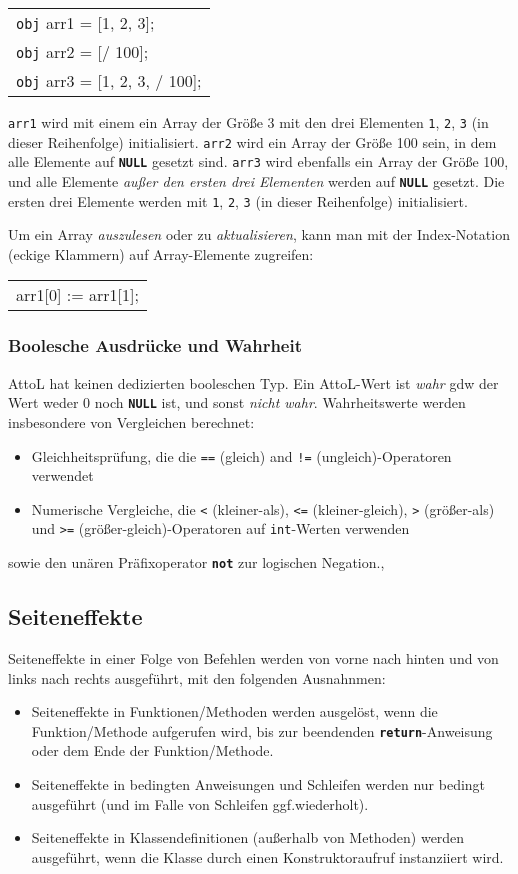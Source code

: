 \documentclass[11pt,a4paper]{article}
\newenvironment{slisting}{%
        \begin{tt}%
        \begin{tabular}{l}%
        }
        {%
        \end{tabular}%
        \end{tt}%
        }
\newcommand{\Cty}[1]{\textcolor{dblue}{\texttt{#1}}}
\newcommand{\Ckw}[1]{\textbf{\texttt{#1}}}
\begin{document}
\begin{slisting}
\Cty{obj} arr1 = [1, 2, 3];\\
\Cty{obj} arr2 = [/ 100];\\
\Cty{obj} arr3 = [1, 2, 3, / 100];\\
\end{slisting}

\texttt{arr1} wird mit einem ein Array der Größe 3 mit den drei Elementen \texttt{1}, \texttt{2}, \texttt{3} (in dieser Reihenfolge) initialisiert.
\texttt{arr2} wird ein Array der Größe 100 sein, in dem alle Elemente auf \Ckw{NULL} gesetzt sind.
\texttt{arr3} wird ebenfalls ein Array der Größe 100, und alle Elemente \emph{außer den ersten drei Elementen} werden auf \Ckw{NULL} gesetzt.
Die ersten drei Elemente werden mit \texttt{1}, \texttt{2}, \texttt{3} (in dieser Reihenfolge) initialisiert.

Um ein Array \emph{auszulesen} oder zu \emph{aktualisieren}, kann man mit der Index-Notation (eckige Klammern) auf Array-Elemente zugreifen:
\begin{slisting}
arr1[0] := arr1[1];
\end{slisting}

\subsubsection{Boolesche Ausdrücke und Wahrheit}\label{sec:truth}
AttoL hat keinen dedizierten booleschen Typ.  Ein AttoL-Wert ist \emph{wahr} gdw der Wert weder
0 noch \Ckw{NULL} ist, und sonst \emph{nicht wahr}.  Wahrheitswerte werden insbesondere von Vergleichen berechnet:
\begin{itemize}
\item Gleichheitsprüfung, die die \texttt{==} (gleich) and \texttt{!=} (ungleich)-Operatoren verwendet
\item Numerische Vergleiche, die \texttt{<} (kleiner-als), \texttt{<=} (kleiner-gleich),
   \texttt{>} (größer-als) und \texttt{>=} (größer-gleich)-Operatoren auf \Cty{int}-Werten verwenden
\end{itemize}
sowie den unären Präfixoperator \Ckw{not} zur logischen Negation., 

\subsection{Seiteneffekte}
Seiteneffekte in einer Folge von Befehlen werden von vorne nach hinten und von links nach rechts ausgeführt, mit den folgenden Ausnahnmen:
\begin{itemize}
\item Seiteneffekte in Funktionen/Methoden werden ausgelöst, wenn die Funktion/Methode aufgerufen wird, bis zur beendenden \Ckw{return}-Anweisung oder dem Ende der Funktion/Methode.
\item Seiteneffekte in bedingten Anweisungen und Schleifen werden nur bedingt ausgeführt (und im Falle von Schleifen ggf.\@ wiederholt).
\item Seiteneffekte in Klassendefinitionen (außerhalb von Methoden) werden ausgeführt, wenn die Klasse durch einen Konstruktoraufruf instanziiert wird.
\end{itemize}
\end{document}
